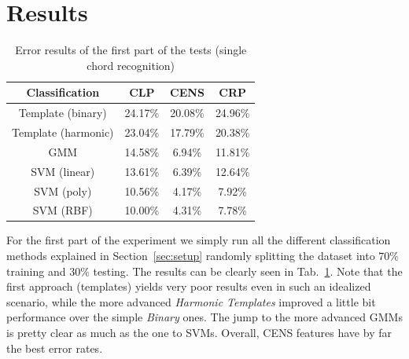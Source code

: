\section{Results}
\label{sec:results}

\begin{table}[t!]
	\centering
	\begin{tabular}{|c|ccc|}
		\hline
		Classification & CLP & CENS & CRP \\
		\hline
		Template (binary) & 24.17\% & 20.08\% & 24.96\% \\
		Template (harmonic) & 23.04\% & 17.79\% & 20.38\% \\
		GMM & 14.58\% & 6.94\% & 11.81\% \\
		\hline
		SVM (linear) & 13.61\% & 6.39\% & 12.64\% \\
		SVM (poly) & 10.56\% & 4.17\% & 7.92\% \\
		SVM (RBF) & 10.00\% & 4.31\% & 7.78\% \\
		\hline
	\end{tabular}
	\caption{Error results of the first part of the tests (single chord recognition)}
	\label{tab:singleChordResults}
	\vspace{-6mm}
\end{table}
%
For the first part of the experiment we simply run all the different classification methods explained in Section~\ref{sec:setup} randomly splitting the dataset into $70\%$ training and $30\%$ testing. The results can be clearly seen in Tab.~\ref{tab:singleChordResults}. Note that the first approach (templates) yields very poor results even in such an idealized scenario, while the more advanced \textit{Harmonic Templates} improved a little bit performance over the simple \textit{Binary} ones. The jump to the more advanced GMMs is pretty clear as much as the one to SVMs. Overall, CENS features have by far the best error rates.
%
